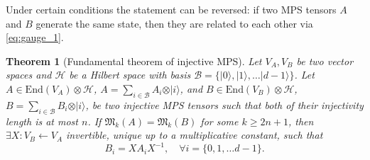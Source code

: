 \documentclass{article}
\newtheorem{theorem}{Theorem}
\newcommand{\End}{\mathrm{End}}
\newcommand{\ket}[1]{\vert #1 \rangle}
\begin{document}
Under certain conditions the statement can be reversed: if two MPS tensors $A$ and $B$ generate the same state, then they are related to each other via \cref{eq:gauge_1}. 


\begin{theorem}[Fundamental theorem of injective MPS]\label{thm:fundamental}
    Let $V_A, V_B$ be two vector spaces and $\mathcal{H}$ be a Hilbert space with basis $\mathcal{B} = \{\ket{0},\ket{1},\dots \ket{d-1}\}$. Let $A\in \End(V_A)\otimes \mathcal{H}$, $A = \sum_{i\in \mathcal{B}} A_i \otimes \ket{i}$, and $B\in \End(V_B)\otimes \mathcal{H}$, $B = \sum_{i\in \mathcal{B}} B_i \otimes \ket{i}$, be two injective MPS tensors such that both of their injectivity length is at most $n$. If $\mathfrak{M}_k(A) = \mathfrak{M}_k(B)$ for some $k\geq 2n+1$,  then $\exists X: V_B \leftarrow V_A$ invertible, unique up to a multiplicative constant, such that 
    \begin{equation*}
       B_i = X A_i X^{-1}, \quad \forall i = \{0,1,\dots d-1\}.
    \end{equation*}
\end{theorem}
\end{document}

